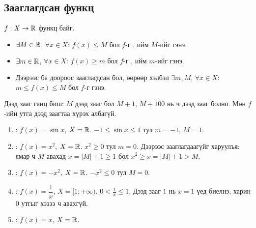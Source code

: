\subsection{Зааглагдсан функц}
\begin{definition}
$f:X\to\mathbb{R}$ функц байг.
\begin{itemize}
  \item $\exists M\in\mathbb{R}$, $\forall x\in X$: $f(x)\le M$ бол $f$-г ,
        ийм $M$-ийг  гэнэ.
  \item $\exists m\in\mathbb{R}$, $\forall x\in X$: $f(x)\ge m$ бол $f$-г ,
        ийм $m$-ийг  гэнэ.
  \item Дээрээс ба доороос зааглагдсан бол, өөрөөр хэлбэл
        $\exists m,M$, $\forall x\in X$: $m\le f(x)\le M$ бол $f$-г  гэнэ.
\end{itemize}
\end{definition}

\begin{remark}
Дээд зааг ганц биш: $M$ дээд зааг бол $M+1$, $M+100$ нь ч дээд зааг болно.
Мөн $f$-ийн утга дээд заагтаа хүрэх албагүй.
\end{remark}

\begin{example}
\leavevmode
\begin{enumerate}
  \item {}: $f(x)=\sin x$, $X=\mathbb{R}$. \; $-1\le\sin x\le 1$ тул $m=-1$, $M=1$.
  \item {}: $f(x)=x^2$, $X=\mathbb{R}$. \; $x^2\ge0$ тул $m=0$.
        Дээрээс зааглагдаагүйг харуулъя: ямар ч $M$ авахад $x=|M|+1\ge1$ бол
        $x^2\ge x=|M|+1>M$.
  \item {}: $f(x)=-x^2$, $X=\mathbb{R}$. \; $-x^2\le0$ тул $M=0$.
  \item {}: $f(x)=\dfrac1x$, $X=[1;+\infty)$.
        \; $0<\frac1x\le1$. Дээд зааг $1$ нь $x=1$ үед биелнэ, харин $0$ утгыг хэзээ ч авахгүй.
  \item {}: $f(x)=x$, $X=\mathbb{R}$.
\end{enumerate}
\end{example}

